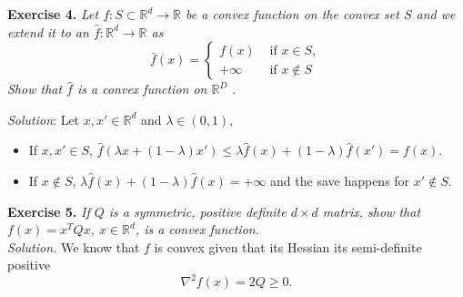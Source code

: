 \documentclass[11pt]{article}
\begin{document}
\textbf{Exercise 4. }\emph{Let \( f : S \subset \mathbb{R}^d  \to \mathbb{R}\) be a convex function on the convex set \( S \) and we extend it to an \( \hat{f}:\mathbb{R}^d \to \mathbb{R}\) as  }
\[
    \bar{f}(x) = \begin{cases}
        f(x) &\text{ if } x \in S,\\
        +\infty &\text{ if } x \notin S
    \end{cases}
\]
\emph{Show that \( \hat{f} \) is a convex function on \( \mathbb{R}^D \) }.

\emph{Solution}: Let \( x, x' \in \mathbb{R}^d \) and \( \lambda \in (0,1) \),
\begin{itemize}
    \item If \( x,x' \in S \), \( \hat{f}(\lambda x + (1-\lambda)x') \leq \lambda\hat{f}(x) + (1-\lambda)\hat{f}(x') = f(x) \).
    \item If \( x \notin S \), \( \lambda \hat{f}(x) + (1-\lambda)\hat{f}(x) =+\infty \) and the save happens for \( x' \notin S \).    
\end{itemize}

\textbf{Exercise 5. }\emph{If \( Q \) is a symmetric, positive definite \( d \times d \) matrix, show that \( f(x) = x^TQx, \ x \in \mathbb{R}^d \), is a convex function.}\\

\emph{Solution. } We know that \( f \) is convex given that its Hessian its semi-definite positive
\[
    \nabla^2 f(x) = 2Q \geq 0.
\]
\end{document}
